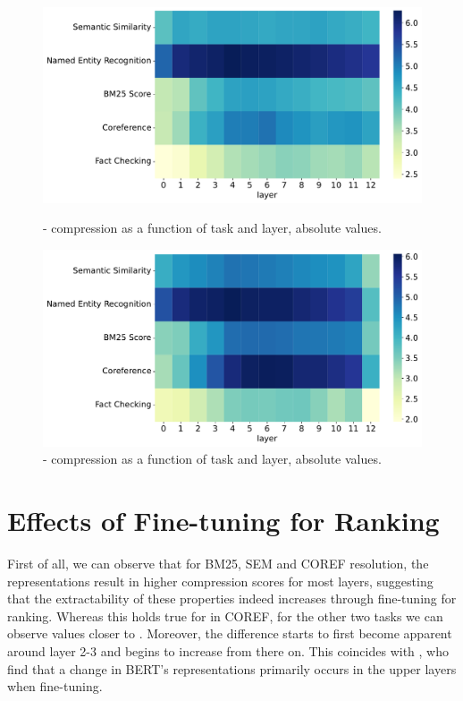 \begin{figure}[!h]
    \centering
    \includegraphics[width=\textwidth]{gfx/probing/abs_heatmap_compression_base}
    \caption{ - compression as a function of task and layer, absolute values.}
    \label{fig:abs_heatmap_comp_base}

    \centering
    \includegraphics[width=\textwidth]{gfx/probing/abs_heatmap_compression_passage}
    \caption{ - compression as a function of task and layer, absolute values.}
    \label{fig:abs_heatmap_comp_passage}
\end{figure}

\section{Effects of Fine-tuning for Ranking}
First of all, we can observe that for BM25, SEM and COREF resolution, the  representations result in higher compression scores for most layers, suggesting that the extractability of these properties indeed increases through fine-tuning for ranking. Whereas this holds true for  in COREF, for the other two tasks we can observe values closer to . Moreover, the difference starts to first become apparent around layer 2-3 and begins to increase from there on. This coincides with \cite{merchant-etal-2020-happens}, who find that a change in BERT's representations primarily occurs in the upper layers when fine-tuning.


